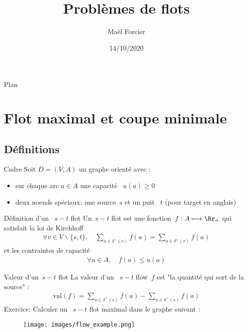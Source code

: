\documentclass{beamer}
\title{Problèmes de flots}
\author[Maël Forcier]{Maël Forcier}
\institute[REOP 2020]{REOP 2020}
\date{14/10/2020}
\newcommand{\val}{\mathrm{val}}
\begin{document}
\begin{frame}
 \maketitle
\end{frame}



\begin{frame}{Plan}
 \tableofcontents
\end{frame}

\section{Flot maximal et coupe minimale}

\subsection{Définitions}

\begin{frame}[t]{Cadre} 
Soit $D = (V, A)$ un graphe orienté avec : \pause
\begin{itemize} 
  \item sur chaque arc $a \in A$ une capacité ~$u(a) \geq 0$ \pause
  \item deux noeuds spéciaux: une source~$s$ et un puit ~$t$ (pour target en anglais)
\end{itemize}
\end{frame}

\begin{frame}[t]{Définition d'un ~$s-t$ flot} \pause
  Un~$s-t$ flot est une fonction~$f: A \longmapsto \Rr_+$ qui satisfait la loi de Kirchhoff \pause
  \begin{align*}
    \forall v \in V \backslash \{s, t\}, \quad \sum_{a \in \delta^-(v)} f(a) = \sum_{a \in \delta^+(v)} f(a)
  \end{align*} \pause
  et les contraintes de capacité \pause
  \begin{align*}
    \forall a \in A, \quad f(a) \leq u(a)
  \end{align*}
\end{frame}

\begin{frame}[t]{Valeur d'un~$s-t$ flot}
  La valeur d'un ~$s-t$ flow~$f$ est "la quantité qui sort de la source" : \pause
  \begin{align*}
    \val(f) = \sum_{a \in \delta^+(s)} f(a) - \sum_{a \in \delta^-(s)} f(a) 
  \end{align*}
  \pause
  Exercice: Calculer un ~$s-t$ flot maximal dans le graphe suivant :
    \begin{figure}
    \centering
    \texttt{[image: images/flow\_example.png]}
\end{figure}
\end{frame}
\end{document}

